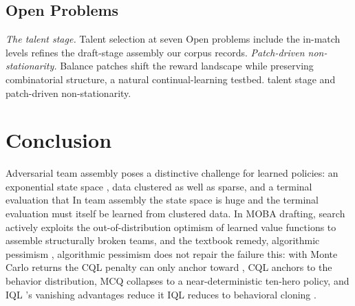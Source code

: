 \documentclass[journal]{IEEEtran}
\providecommand{\DIFaddtex}[1]{{\protect\color{blue} \sf #1}} %
\providecommand{\DIFdeltex}[1]{{\protect\color{red} \scriptsize #1}} %
\providecommand{\DIFaddbegin}{} %
\providecommand{\DIFaddend}{} %
\providecommand{\DIFdelbegin}{} %
\providecommand{\DIFdelend}{} %
\providecommand{\DIFadd}[1]{\texorpdfstring{\DIFaddtex{#1}}{#1}} %
\providecommand{\DIFdel}[1]{\texorpdfstring{\DIFdeltex{#1}}{}} %
\begin{document}
\subsection{\DIFdel{Open Problems}}
\addtocounter{subsection}{-1}%

\DIFdel{\textit{The talent stage.} Talent selection at seven }\DIFdelend \DIFaddbegin \DIFadd{Open problems include the }\DIFaddend in-match \DIFdelbegin \DIFdel{levels refines the draft-stage assembly our corpus records.
\textit{Patch-driven non-stationarity.} Balance patches shift the reward landscape while preserving combinatorial structure, a natural continual-learning testbed.
}\DIFdelend \DIFaddbegin \DIFadd{talent stage and patch-driven non-stationarity.
}

\DIFaddend \section{Conclusion}

\DIFdelbegin \DIFdel{Adversarial team assembly poses a distinctive challenge for learned policies: an exponential state space , data clustered as well as sparse, and a terminal evaluation that }\DIFdelend \DIFaddbegin \DIFadd{In team assembly the state space is huge and the terminal evaluation }\DIFaddend must itself be learned \DIFaddbegin \DIFadd{from clustered data}\DIFaddend . In MOBA drafting, search \DIFdelbegin \DIFdel{actively }\DIFdelend exploits the out-of-distribution optimism of learned value functions to assemble \DIFdelbegin \DIFdel{structurally }\DIFdelend broken teams, and \DIFdelbegin \DIFdel{the textbook remedy, algorithmic pessimism , }\DIFdelend \DIFaddbegin \DIFadd{algorithmic pessimism }\DIFaddend does not repair \DIFdelbegin \DIFdel{the failure}\DIFdelend \DIFaddbegin \DIFadd{this}\DIFaddend : with Monte Carlo returns\DIFdelbegin \DIFdel{the CQL penalty can only anchor toward }\DIFdelend \DIFaddbegin \DIFadd{, CQL anchors to }\DIFaddend the behavior distribution, \DIFdelbegin \DIFdel{MCQ collapses to a near-deterministic ten-hero policy, and IQL 's vanishing advantages reduce it }\DIFdelend \DIFaddbegin \DIFadd{IQL reduces }\DIFaddend to behavioral cloning\DIFdelbegin \DIFdel{.
}%
\end{document}
